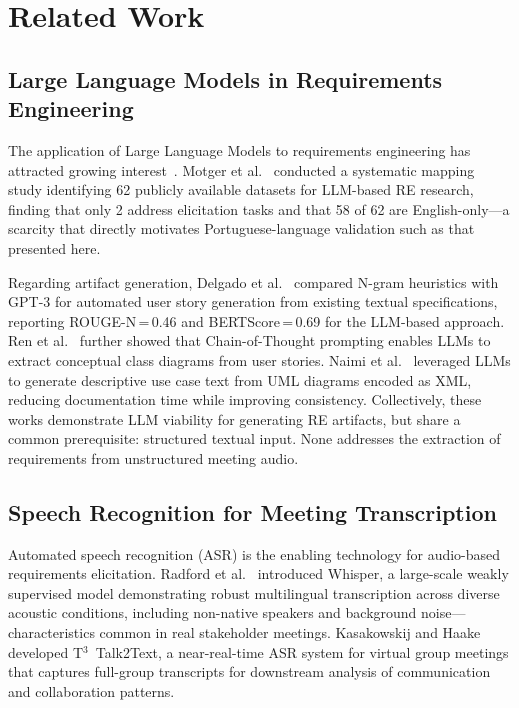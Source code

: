 \documentclass[sigconf]{acmart}
\begin{document}
\section{Related Work}
\label{sec:related}

\subsection{Large Language Models in Requirements Engineering}

The application of Large Language Models to requirements engineering
has attracted growing interest~\cite{hort2025survey}. Motger et
al.~\cite{motger2025share} conducted a systematic mapping study
identifying 62 publicly available datasets for LLM-based RE research,
finding that only 2 address elicitation tasks and that 58 of 62 are
English-only—a scarcity that directly motivates Portuguese-language
validation such as that presented here.

Regarding artifact generation, Delgado et
al.~\cite{delgado2024aidriven} compared N-gram heuristics with GPT-3
for automated user story generation from existing textual
specifications, reporting ROUGE-N\,=\,0.46 and BERTScore\,=\,0.69
for the LLM-based approach. Ren et al.~\cite{ren2024combining} further
showed that Chain-of-Thought prompting enables LLMs to extract
conceptual class diagrams from user stories. Naimi et
al.~\cite{naimi2024automating} leveraged LLMs to generate descriptive
use case text from UML diagrams encoded as XML, reducing documentation
time while improving consistency. Collectively, these works demonstrate
LLM viability for generating RE artifacts, but share a common
prerequisite: structured textual input. None addresses the extraction
of requirements from unstructured meeting audio.

\subsection{Speech Recognition for Meeting Transcription}

Automated speech recognition (ASR) is the enabling technology for
audio-based requirements elicitation. Radford et
al.~\cite{whisper2022} introduced Whisper, a large-scale weakly
supervised model demonstrating robust multilingual transcription across
diverse acoustic conditions, including non-native speakers and
background noise—characteristics common in real stakeholder meetings.
Kasakowskij and Haake~\cite{kasakowskij2025talk2text} developed
T$^3$~Talk2Text, a near-real-time ASR system for virtual group
meetings that captures full-group transcripts for downstream analysis
of communication and collaboration patterns.
\end{document}
